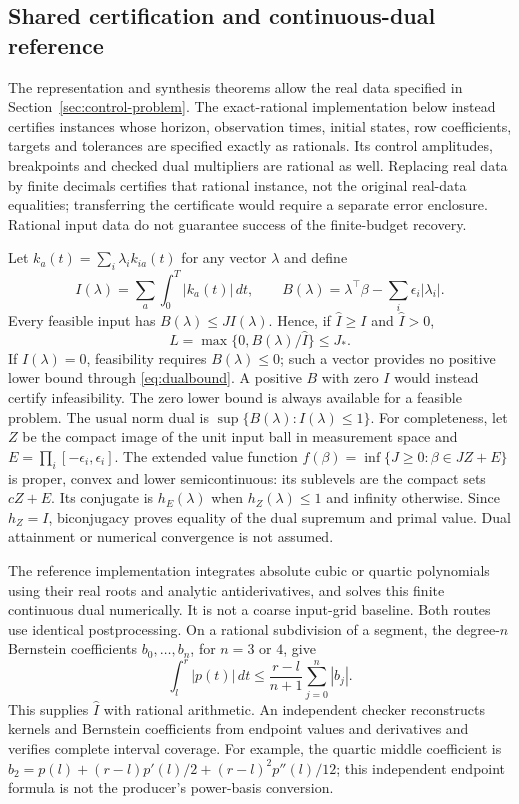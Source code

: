 \documentclass[pdflatex,sn-mathphys-num]{sn-jnl}
\theoremstyle{thmstyleone}
\theoremstyle{thmstyletwo}\newtheorem{remark}[theorem]{Remark}
\begin{document}
\subsection{Shared certification and continuous-dual reference}\label{sec:certification}
The representation and synthesis theorems allow the real data specified in
Section~\ref{sec:control-problem}. The exact-rational implementation below
instead certifies instances whose horizon, observation times, initial states,
row coefficients, targets and tolerances are specified exactly as rationals.
Its control amplitudes, breakpoints and checked dual multipliers are rational
as well. Replacing real data by finite decimals certifies that rational
instance, not the original real-data equalities; transferring the certificate
would require a separate error enclosure. Rational input data do not guarantee
success of the finite-budget recovery.

Let $k_a(t)=\sum_i\lambda_i k_{ia}(t)$ for any vector $\lambda$ and define
\[
 I(\lambda)=\sum_a\int_0^T|k_a(t)|\,dt,\qquad
 B(\lambda)=\lambda^\top\beta-\sum_i\epsilon_i|\lambda_i|.
\]
Every feasible input has $B(\lambda)\le JI(\lambda)$. Hence, if
$\widehat I\ge I$ and $\widehat I>0$,
\begin{equation}\label{eq:dualbound}
 L=\max\{0,B(\lambda)/\widehat I\}\le J_*.
\end{equation}
If $I(\lambda)=0$, feasibility requires $B(\lambda)\le0$; such a vector
provides no positive lower bound through \eqref{eq:dualbound}. A positive $B$ with zero $I$
would instead certify infeasibility. The zero lower bound is always available
for a feasible problem.
The usual norm dual is $\sup\{B(\lambda):I(\lambda)\le1\}$.
For completeness, let $Z$ be the compact image of the unit input ball in
measurement space and $E=\prod_i[-\epsilon_i,\epsilon_i]$. The extended
value function $f(\beta)=\inf\{J\ge0:\beta\in JZ+E\}$ is proper,
convex and lower semicontinuous: its sublevels are the compact sets $cZ+E$.
Its conjugate is $h_E(\lambda)$ when $h_Z(\lambda)\le1$ and infinity
otherwise. Since $h_Z=I$, biconjugacy proves equality of the dual supremum
and primal value. Dual attainment or numerical convergence is not assumed.

The reference implementation integrates absolute cubic or quartic polynomials using
their real roots and analytic antiderivatives, and solves this finite
continuous dual numerically. It is not a coarse input-grid baseline.
Both routes use identical postprocessing. On a rational subdivision of a
segment, the degree-$n$ Bernstein coefficients $b_0,\ldots,b_n$, for
$n=3$ or $4$, give
\[
 \int_l^r|p(t)|\,dt\le\frac{r-l}{n+1}\sum_{j=0}^n|b_j|.
\]
This supplies $\widehat I$ with rational arithmetic. An independent checker
reconstructs kernels and Bernstein coefficients from endpoint values and
derivatives and verifies complete interval coverage. For example, the quartic
middle coefficient is $b_2=p(l)+(r-l)p'(l)/2+(r-l)^2p''(l)/12$;
this independent endpoint formula is not the producer's power-basis conversion.
\end{document}
